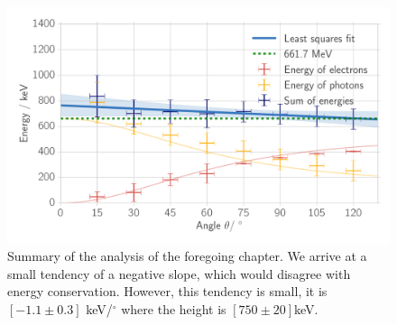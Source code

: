 \begin{figure}[htpb]
    \centering
    \includegraphics[width=0.9\linewidth]{./analysis/figures/energy_conservation}
    \caption{Summary of the analysis of the foregoing chapter. We arrive at a small tendency of a negative slope, which
    would disagree with energy conservation. However, this tendency is small, it is
    $[-1.1 \pm 0.3]$ keV/$^\circ$ where the height is $[750 \pm 20]$keV.}
\label{fig:energy_conservation}
\end{figure}
\clearpage

